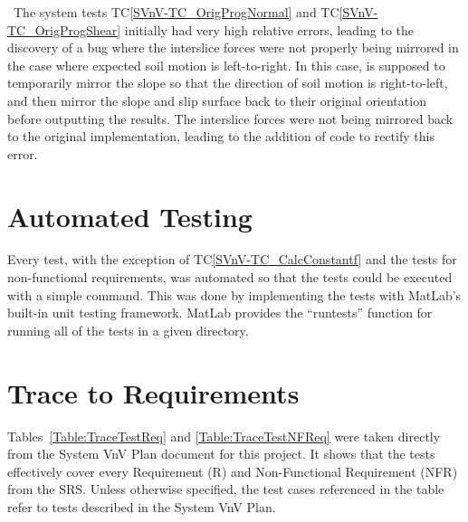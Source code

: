 \documentclass[12pt, titlepage]{article}
\newcommand{\tcref}[1]{TC\ref{#1}}
\begin{document}
~\newline \noindent The system tests \tcref{SVnV-TC_OrigProgNormal} 
and \tcref{SVnV-TC_OrigProgShear} initially had very high relative errors, 
leading to the discovery of a bug where the interslice forces were not properly 
being mirrored in the case where expected soil motion is left-to-right. In this 
case, \progname{} is supposed to temporarily mirror the slope so that the 
direction of soil motion is right-to-left, and then mirror the slope and slip 
surface back to their original orientation before outputting the results. The 
interslice forces were not being mirrored back to the original implementation, 
leading to the addition of code to rectify this error.

\section{Automated Testing} \label{sec_AutoTests}

Every test, with the exception of \tcref{SVnV-TC_CalcConstantf} and the tests 
for non-functional requirements, was automated so that the tests could be 
executed with a simple command. This was done by implementing the tests with 
MatLab's built-in unit testing framework. MatLab provides the ``runtests'' 
function for running all of the tests in a given directory.
		
\section{Trace to Requirements} \label{sec_TraceReq}

Tables~\ref{Table:TraceTestReq} and \ref{Table:TraceTestNFReq} were taken 
directly from the System VnV Plan document for this project. It shows that the 
tests effectively cover every Requirement (R) and Non-Functional Requirement 
(NFR) from the SRS. Unless otherwise specified, the test cases referenced in 
the table refer to tests described in the System VnV Plan.
\end{document}
